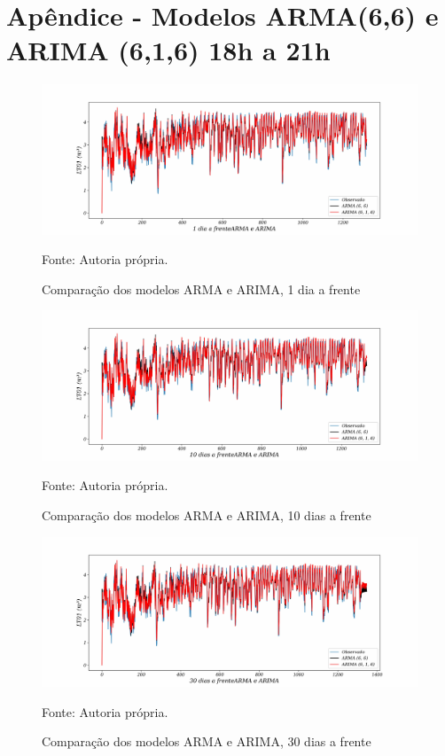 
\section{Ap\^endice - Modelos ARMA(6,6) e ARIMA (6,1,6) 18h a 21h}\label{sec:armarima18}

\begin{figure}[H]
	\centering
	\caption{Comparação dos modelos ARMA e ARIMA, 1 dia a frente }
	\label{fig:1-ARMA-ARIMA}
	\includegraphics[width=1\linewidth]{Apendices/Figuras/modelagem-18-a-21h/1-ARMA-ARIMA}
	
	Fonte: Autoria própria.
\end{figure}

\begin{figure}[H]
	\centering
	\caption{Comparação dos modelos ARMA e ARIMA, 10 dias a frente }
	\label{fig:10-ARMA-ARIMA}
	\includegraphics[width=1\linewidth]{Apendices/Figuras/modelagem-18-a-21h/10-ARMA-ARIMA}
	
	Fonte: Autoria própria.
\end{figure}


\begin{figure}[H]
	\centering
	\caption{Comparação dos modelos ARMA e ARIMA, 30 dias a frente }
	\label{fig:30-ARMA-ARIMA}
	\includegraphics[width=1\linewidth]{Apendices/Figuras/modelagem-18-a-21h/30-ARMA-ARIMA}
	
	Fonte: Autoria própria.
\end{figure}

